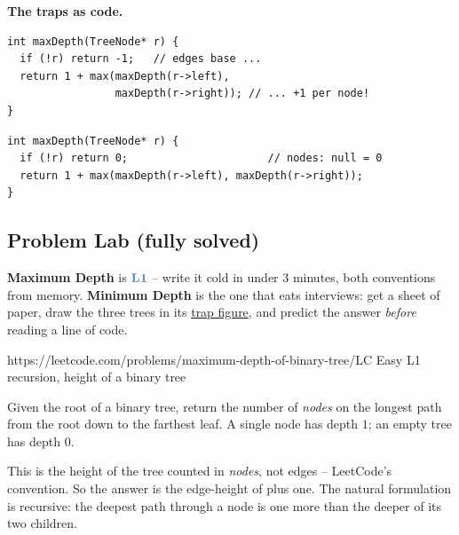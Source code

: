 \smallskip\noindent\textbf{The traps as code.}

\begin{lstlisting}[caption={\textcolor{warningred}{WRONG -- mixed conventions:} LC-104 statement (nodes) with the edges base case}, basicstyle=\ttfamily\small]
int maxDepth(TreeNode* r) {
  if (!r) return -1;   // edges base ...
  return 1 + max(maxDepth(r->left),
                 maxDepth(r->right)); // ... +1 per node!
}
\end{lstlisting}
\begin{lstlisting}[caption={\textcolor{successgreen}{RIGHT -- pick one convention and keep it (nodes here)}}, basicstyle=\ttfamily\small, breaklines=true]
int maxDepth(TreeNode* r) {
  if (!r) return 0;                      // nodes: null = 0
  return 1 + max(maxDepth(r->left), maxDepth(r->right));
}
\end{lstlisting}

\subsection{Problem Lab (fully solved)}

\begin{attemptgate}
\textbf{Maximum Depth} is $\lv1$ -- write it cold in under 3 minutes, both
conventions from memory. \textbf{Minimum Depth} is the one that eats
interviews: get a sheet of paper, draw the three trees in its
\hyperref[fig:c01-min-depth-trap]{trap figure}, and predict the answer
\emph{before} reading a line of code.
\end{attemptgate}

  {https://leetcode.com/problems/maximum-depth-of-binary-tree/}{LC Easy L1}
  {recursion, height of a binary tree}

\begin{problemstatement}
Given the root of a binary tree, return the number of \emph{nodes} on the longest path
from the root down to the farthest leaf. A single node has depth $1$; an empty tree has
depth $0$.
\end{problemstatement}

This is the height of the tree counted in \emph{nodes}, not edges -- LeetCode's
convention. So the answer is the edge-height of  plus one.
The natural formulation is recursive: the deepest path through a node is one more than
the deeper of its two children.

